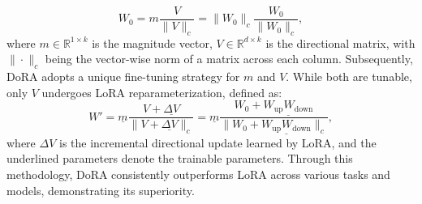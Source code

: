 \begin{equation}
    W_0 = m \frac{V}{\|V\|_c} = \|W_0\|_c \frac{W_0}{\|W_0\|_c},
\end{equation}
where $m \in \mathbb{R}^{1 \times k}$ is the magnitude vector, $V \in \mathbb{R}^{d \times k}$ is the
directional matrix, with $\| \cdot \|_c$ being the vector-wise norm of a matrix across each column. Subsequently, DoRA adopts a unique fine-tuning strategy for $m$ and $V$. While both are tunable, only $V$ undergoes LoRA reparameterization, defined as:
\begin{equation}
    W' = \underline{m} \frac{V + \underline{\Delta V}}{\|V + \underline{\Delta V}\|_c} = \underline{m} \frac{W_0 + \underline{W_{\text{up}}W_{\text{down}}}}{\|W_0 + \underline{W_{\text{up}}W_{\text{down}}}\|_c},
\end{equation}
where $\Delta V$ is the incremental directional update learned by LoRA, and the underlined parameters denote the trainable parameters. Through this methodology, DoRA consistently outperforms LoRA across various tasks and models, demonstrating its superiority.



